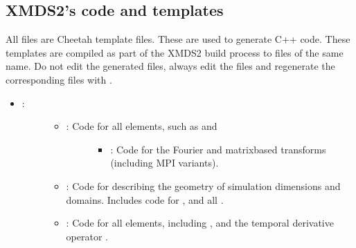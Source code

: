 \documentclass[letterpaper,10pt,english]{sphinxmanual}
\begin{document}
\subsection{XMDS2’s code and templates}
\label{\detokenize{developer:xmds2-s-code-and-templates}}
\sphinxAtStartPar
All  files are Cheetah template files.  These are used to generate C++ code.  These templates are compiled as part of the XMDS2 build process to  files of the same name.  Do not edit the generated  files, always edit the  files and regenerate the corresponding  files with .
\begin{itemize}
\item {} \begin{description}
\item[{:}] \leavevmode\begin{itemize}
\item {} \begin{description}
\item[{: Code for all  elements, such as  and }] \leavevmode\begin{itemize}
\item {} 
\sphinxAtStartPar
{}: Code for the Fourier and matrix\sphinxhyphen{}based transforms (including MPI variants).

\end{itemize}

\end{description}

\item {} 
\sphinxAtStartPar
{}: Code for describing the geometry of simulation dimensions and domains.  Includes code for ,  and all .

\item {} 
\sphinxAtStartPar
{}: Code for all  elements, including ,  and the temporal derivative operator .


\end{itemize}
\end{description}
\end{itemize}
\end{document}
